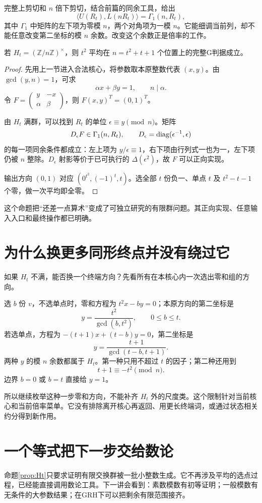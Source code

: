 \documentclass[11pt,a4paper,oneside,openany]{book}
\newcommand{\Z}{\mathbb Z}\newcommand{\Q}{\mathbb Q}\newcommand{\F}{\mathbb F}\newcommand{\CC}{\mathbb C}
\theoremstyle{definition}\newtheorem{example}[theorem]{例}\newtheorem{conjecture}[theorem]{猜想}
\numberwithin{equation}{chapter}\setcounter{tocdepth}{1}
\begin{document}
完整上剪切和 $n$ 倍下剪切，结合前篇的同余工具，给出
\[\langle U(R_t),L(nR_t)\rangle=\Gamma_1(n,R_t),
\]
其中 $\Gamma_1$ 中矩阵的左下项为零模 $n$，两个对角项为一模 $n$。它能细调当前列，却不能任意改变第二坐标的模 $n$ 余数。改变这个余数正是倍率的工作。

\begin{proposition}[平方族的充分算术接口]\label{prop:Ht}
若 $H_t=(\Z/n\Z)^\times$，则 $t^2$ 平均在 $n=t^2+t+1$ 个位置上的完整G判据成立。
\end{proposition}
\begin{proof}
先用上一节进入合法核心，将参数取本原整数代表 $(x,y)$。由 $\gcd(y,n)=1$，可求
\[\alpha x+\beta y=1,\qquad n\mid\alpha.
\]
令 $F=\left(\begin{smallmatrix}y&-x\\\alpha&\beta\end{smallmatrix}\right)$，则 $F(x,y)^T=(0,1)^T$。

由 $H_t$ 满群，可以找到 $R_t$ 的单位 $\epsilon\equiv y\pmod n$。矩阵
\[D_\epsilon F\in\Gamma_1(n,R_t),\qquad
D_\epsilon=\operatorname{diag}(\epsilon^{-1},\epsilon)
\]
的每一项同余条件都成立：左上项为 $y/\epsilon\equiv1$，右下项由行列式一也为一，左下项仍被 $n$ 整除。$D_\epsilon$ 射影等价于已可执行的 $\Delta(\epsilon^2)$，故 $F$ 可以正向实现。

输出方向 $(0,1)$ 对应 $(0^{t^2},(-1)^t,t)$。选全部 $t$ 份负一、单点 $t$ 及 $t^2-t-1$ 个零，做一次平均即全零。
\end{proof}

这个命题把“还差一点算术”变成了可独立研究的有限群问题。其正向实现、任意输入入口和最终操作都已明确。

\section{为什么换更多同形终点并没有绕过它}
如果 $H_t$ 不满，能否换一个终端方向？先看所有在本核心内一次选出零和组的方向。

选 $b$ 份 $v$，不选单点时，零和方程为 $t^2x-by=0$；本原方向的第二坐标是
\[y=\frac{t^2}{\gcd(b,t^2)},\qquad0\le b\le t.
\]
若选单点，方程为 $-(t+1)x+(t-b)y=0$，第二坐标是
\[y=\frac{t+1}{\gcd(t-b,t+1)}.
\]
两种 $y$ 的模 $n$ 余数都属于 $H_t$。第一种只用不超过 $t$ 的因子；第二种还用到
\[t+1\equiv-t^2\pmod n.
\]
边界 $b=0$ 或 $b=t$ 直接给 $y=1$。

所以继续枚举这种一步零和方向，不能补齐 $H_t$ 外的尺度类。这个限制针对当前核心和当前倍率菜单。它没有排除离开核心再返回、用更长终端词，或通过状态相关约分得到新作用。

\section{一个等式把下一步交给数论}
命题\ref{prop:Ht}只要求证明有限交换群被一批小整数生成。它不再涉及平均的选点过程，已经能直接调用数论工具。下一讲会看到：素数模数有初等证明；一般模数有无条件的大参数结果；在GRH下可以把剩余有限范围接齐。
\end{document}
